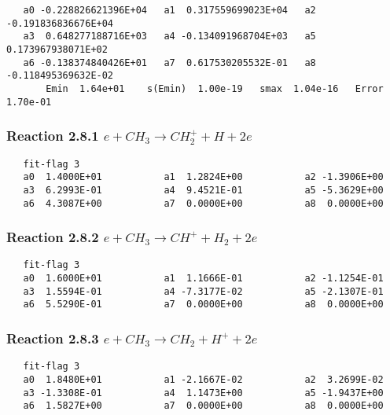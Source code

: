 \documentclass[12pt]{article}
\begin{document}
\begin{small}\begin{verbatim}
   a0 -0.228826621396E+04   a1  0.317559699023E+04   a2 -0.191836836676E+04
   a3  0.648277188716E+03   a4 -0.134091968704E+03   a5  0.173967938071E+02
   a6 -0.138374840426E+01   a7  0.617530205532E-01   a8 -0.118495369632E-02
       Emin  1.64e+01    s(Emin)  1.00e-19   smax  1.04e-16   Error  1.70e-01
\end{verbatim}\end{small}


\subsubsection{
Reaction 2.8.1    $e + CH_{3} \rightarrow CH_{2}^{+} + H +2e $
}
 
\begin{small}\begin{verbatim}
   fit-flag 3
   a0  1.4000E+01           a1  1.2824E+00           a2 -1.3906E+00 
   a3  6.2993E-01           a4  9.4521E-01           a5 -5.3629E+00 
   a6  4.3087E+00           a7  0.0000E+00           a8  0.0000E+00
\end{verbatim}\end{small}




\subsubsection{
Reaction 2.8.2    $e + CH_{3} \rightarrow CH^{+} + H_{2} +2e$
}
 
\begin{small}\begin{verbatim}
   fit-flag 3
   a0  1.6000E+01           a1  1.1666E-01           a2 -1.1254E-01 
   a3  1.5594E-01           a4 -7.3177E-02           a5 -2.1307E-01 
   a6  5.5290E-01           a7  0.0000E+00           a8  0.0000E+00
\end{verbatim}\end{small}


\subsubsection{
Reaction 2.8.3    $e + CH_{3} \rightarrow CH_{2} + H^{+} +2e $
}
 
\begin{small}\begin{verbatim}
   fit-flag 3
   a0  1.8480E+01           a1 -2.1667E-02           a2  3.2699E-02 
   a3 -1.3308E-01           a4  1.1473E+00           a5 -1.9437E+00 
   a6  1.5827E+00           a7  0.0000E+00           a8  0.0000E+00
\end{verbatim}\end{small}
\end{document}
